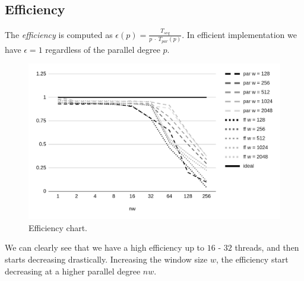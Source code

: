 \subsection{Efficiency}
The \textit{efficiency} is computed as $\epsilon(p) = \frac{T_{seq}}{p\ \cdot\ T_{par}(p)}$. In efficient implementation we have $\epsilon = 1$ regardless of the parallel degree $p$.

\begin{figure}[H]
    \centering
    \includegraphics[width=.8\linewidth]{assets/efficiency_ideal}
    \caption{Efficiency chart.}
    \label{fig:efficiency}
\end{figure}

\noindent
We can clearly see that we have a high efficiency up to $16$ - $32$ threads, and then starts decreasing drastically. Increasing the window size $w$, the efficiency start decreasing at a higher parallel degree $nw$.